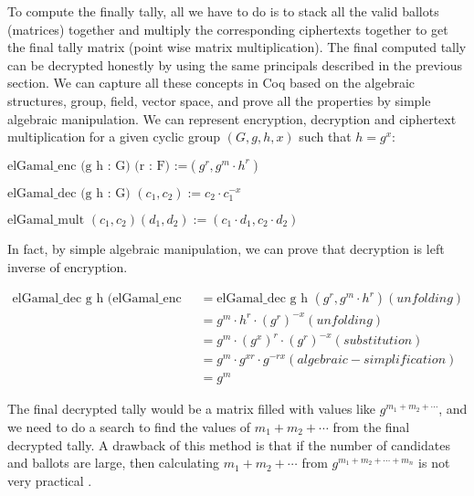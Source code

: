 To compute the finally tally, all we have to do is to stack all the valid
ballots (matrices) together and multiply the corresponding ciphertexts 
together to get the final tally matrix (point wise matrix multiplication). 
The final computed tally can be 
decrypted honestly by using the same principals described in the previous 
section.  We can capture all these concepts in Coq based on the 
algebraic structures, group, field, vector space, and prove all the 
properties by simple algebraic manipulation. We can represent 
encryption, decryption and ciphertext multiplication for 
a given cyclic group $(G, g, h, x)$ such that $h = g^x$:

\begin{displayquote}
$\text{elGamal\_enc (g h : G) (r : F) :=} (g^r, g^m \cdot h^r)$

$\text{elGamal\_dec (g h : G) }  (c_{1}, c_{2}) := c_{2} \cdot c_{1}^{-x}$

$\text{elGamal\_mult } (c_{1}, c_{2}) (d_{1}, d_{2}) := (c_{1} \cdot d_{1}, c_{2} \cdot d_{2})$

\end{displayquote}

\noindent
In fact, by simple algebraic manipulation, we can prove that 
decryption is left inverse of encryption. 


\begin{align}
  \text{elGamal\_dec g h (elGamal\_enc g h r)} &= \text{elGamal\_dec g h } (g^r, g^m \cdot h^r)  (unfolding) \nonumber \\
                     &= g^m \cdot h^r \cdot (g^r)^{-x}  (unfolding) \nonumber \\
                     &= g^m \cdot (g^x)^r \cdot (g^r)^{-x} (substitution) \nonumber \\
                     &=  g^m \cdot g^{xr} \cdot g^{-rx} (algebraic-simplification)\nonumber \\
                     &= g^m\nonumber 
\end{align}


\noindent 
The final decrypted tally would be a matrix filled with values like $g^{m_{1} + m_{2} + \cdots }$, and we 
need to do a search to find the values of $m_{1} + m_{2} + \cdots$ from the 
final decrypted tally. A drawback of this method is that if the number of candidates and ballots are
 large, then calculating $m_{1} + m_{2} + \cdots$ from 
	      $g^{m_{1} + m_{2} + \dotsb  + m_{n}}$ is 
	      not very practical \citep{10.1007/3-540-69053-0_9}.  


